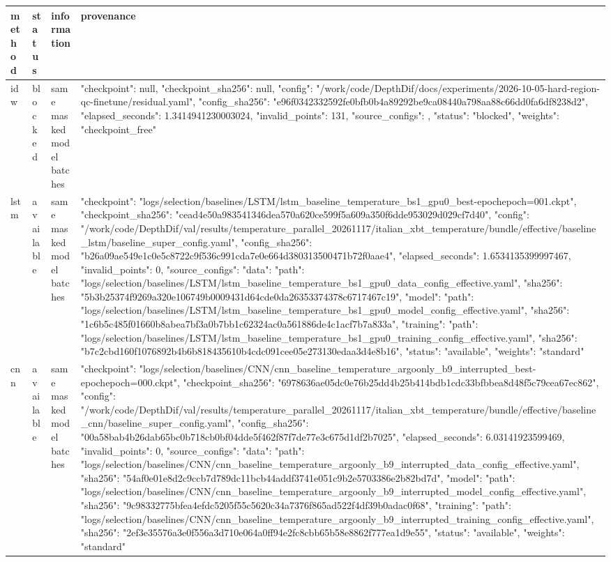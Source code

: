 \begin{tabular}{llll}
\toprule
method & status & information & provenance \\
\midrule
idw & blocked & same masked model batches & {"checkpoint": null, "checkpoint_sha256": null, "config": "/work/code/DepthDif/docs/experiments/2026-10-05-hard-region-qc-finetune/residual.yaml", "config_sha256": "e96f0342332592fe0bfb0b4a89292be9ca08440a798aa88c66dd0fa6df8238d2", "elapsed_seconds": 1.3414941230003024, "invalid_points": 131, "source_configs": {}, "status": "blocked", "weights": "checkpoint_free"} \\
lstm & available & same masked model batches & {"checkpoint": "logs/selection/baselines/LSTM/lstm_baseline_temperature_bs1_gpu0_best-epochepoch=001.ckpt", "checkpoint_sha256": "cead4e50a983541346dea570a620ce599f5a609a350f6dde953029d029cf7d40", "config": "/work/code/DepthDif/val/results/temperature_parallel_20261117/italian_xbt_temperature/bundle/effective/baseline_lstm/baseline_super_config.yaml", "config_sha256": "b26a09ae549e1c0e5c8722c9f536c991cda7e0e664d380313500471b72f0aae4", "elapsed_seconds": 1.6534135399997467, "invalid_points": 0, "source_configs": {"data": {"path": "logs/selection/baselines/LSTM/lstm_baseline_temperature_bs1_gpu0_data_config_effective.yaml", "sha256": "5b3b25374f9269a320e106749b0009431d64cde0da26353374378c6717467c19"}, "model": {"path": "logs/selection/baselines/LSTM/lstm_baseline_temperature_bs1_gpu0_model_config_effective.yaml", "sha256": "1c6b5c485f01660b8abea7bf3a0b7bb1c62324ac0a561886de4c1acf7b7a833a"}, "training": {"path": "logs/selection/baselines/LSTM/lstm_baseline_temperature_bs1_gpu0_training_config_effective.yaml", "sha256": "b7c2cbd160f1076892b4b6b818435610b4cdc091cee05e273130edaa3d4e8b16"}}, "status": "available", "weights": "standard"} \\
cnn & available & same masked model batches & {"checkpoint": "logs/selection/baselines/CNN/cnn_baseline_temperature_argoonly_b9_interrupted_best-epochepoch=000.ckpt", "checkpoint_sha256": "6978636ae05dc0e76b25dd4b25b414bdb1cdc33bfbbea8d48f5c79cea67ec862", "config": "/work/code/DepthDif/val/results/temperature_parallel_20261117/italian_xbt_temperature/bundle/effective/baseline_cnn/baseline_super_config.yaml", "config_sha256": "00a58bab4b26dab65bc0b718cb0bf04dde5f462f87f7de77e3c675d1df2b7025", "elapsed_seconds": 6.03141923599469, "invalid_points": 0, "source_configs": {"data": {"path": "logs/selection/baselines/CNN/cnn_baseline_temperature_argoonly_b9_interrupted_data_config_effective.yaml", "sha256": "54af0e01e8d2c9ccb7d789dc11bcb44addf3741e051c9b2e5703386e2b82bd7d"}, "model": {"path": "logs/selection/baselines/CNN/cnn_baseline_temperature_argoonly_b9_interrupted_model_config_effective.yaml", "sha256": "9c98332775bfea4efdc5205f55c5620c34a7376f865ad522f4df39b0adac0f68"}, "training": {"path": "logs/selection/baselines/CNN/cnn_baseline_temperature_argoonly_b9_interrupted_training_config_effective.yaml", "sha256": "2ef3e35576a3e0f556a3d710e064a0ff94e2fc8cbb65b58e8862f777ea1d9e55"}}, "status": "available", "weights": "standard"} \\

\end{tabular}
